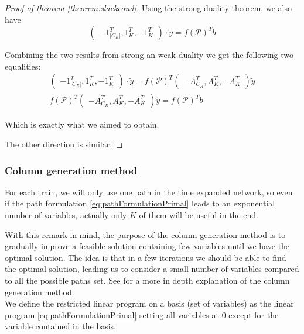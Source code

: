 \documentclass[14pt,a4paper]{article}
\theoremstyle{definition}
\numberwithin{equation}{subsection}
\begin{document}
\begin{proof}[Proof of theorem \ref{theorem:slackcond}]
 Using the strong duality theorem, we also have 
 $$\left( \begin{matrix} -1_{|C_R|}^T, 1_K^T, -1_K^T  \end{matrix} \right)\cdot \tilde{y} =  f(\mathcal{P})^Tb  $$

Combining the two results from strong an weak duality we get the following two equalities:
\begin{align*}
\left( \begin{matrix} -1_{|C_R|}^T, 1_K^T, -1_K^T  \end{matrix} \right)\cdot \tilde{y} = 
f(\mathcal{P})^T \left( \begin{matrix} -A_{C_R}^T, A_K^T, -A_K^T \end{matrix} \right)\tilde{y} \\
f(\mathcal{P})^T \left( \begin{matrix} -A_{C_R}^T, A_K^T, -A_K^T \end{matrix} \right)\tilde{y} =  f(\mathcal{P})^Tb 
\end{align*}

Which is exactly what we aimed to obtain.

The other direction is similar.

	 
	 
\end{proof}
\subsubsection{Column generation method}

For each train, we will only use one path in the time expanded network, so even if the path formulation \eqref{eq:pathFormulationPrimal} leads to an exponential number of variables, actually only $K$ of them will be useful in the end. 

With this remark in mind, the purpose of the column generation method is to gradually improve a feasible solution containing few variables until we have the optimal solution. The idea is that in a few iterations we should be able to find the optimal solution, leading us to consider a small number of variables compared to all the possible paths set. See \cite{LectureNotes} for a more in depth explanation of the column generation method.
\\

We define the restricted linear program on a basis (set of variables) as the linear program \eqref{eq:pathFormulationPrimal} setting all variables at $0$ except for the variable contained in the basis.\\
\end{document}
